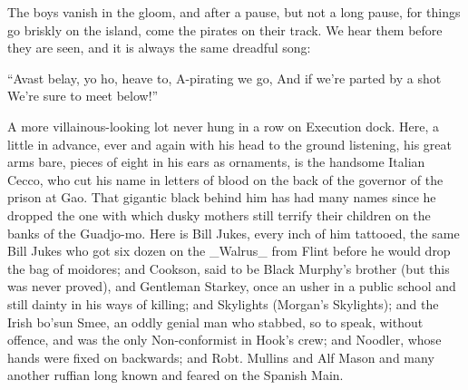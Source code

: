 The boys vanish in the gloom, and after a pause, but not a long pause,
for things go briskly on the island, come the pirates on their track.
We hear them before they are seen, and it is always the same dreadful
song:

``Avast belay, yo ho, heave to,
    A-pirating we go,
And if we're parted by a shot
    We're sure to meet below!''

A more villainous-looking lot never hung in a row on Execution dock.
Here, a little in advance, ever and again with his head to the ground
listening, his great arms bare, pieces of eight in his ears as
ornaments, is the handsome Italian Cecco, who cut his name in letters
of blood on the back of the governor of the prison at Gao. That
gigantic black behind him has had many names since he dropped the one
with which dusky mothers still terrify their children on the banks of
the Guadjo-mo. Here is Bill Jukes, every inch of him tattooed, the same
Bill Jukes who got six dozen on the _Walrus_ from Flint before he would
drop the bag of moidores; and Cookson, said to be Black Murphy's
brother (but this was never proved), and Gentleman Starkey, once an
usher in a public school and still dainty in his ways of killing; and
Skylights (Morgan's Skylights); and the Irish bo'sun Smee, an oddly
genial man who stabbed, so to speak, without offence, and was the only
Non-conformist in Hook's crew; and Noodler, whose hands were fixed on
backwards; and Robt. Mullins and Alf Mason and many another ruffian
long known and feared on the Spanish Main.

